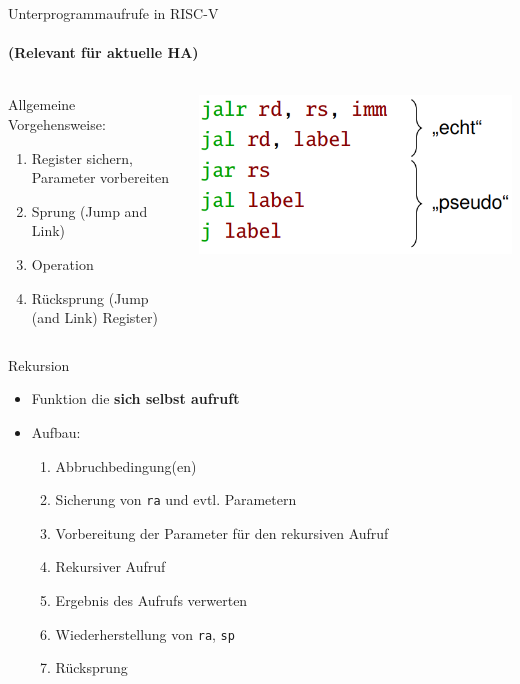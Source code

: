 \documentclass[
  german,            %
  aspectratio=169,    %
]{tumbeamer}
\begin{document}
\begin{frame}[c]{Unterprogrammaufrufe in RISC-V}
  \framesubtitle{(Relevant für aktuelle HA)}
  \begin{columns}[c]
    \begin{column}{0.5\textwidth}
      Allgemeine Vorgehensweise:\\[.2cm] 
      \begin{enumerate}
        \item Register sichern, Parameter vorbereiten
        \item Sprung (Jump and Link)
        \item Operation
        \item Rücksprung (Jump (and Link) Register)
      \end{enumerate}
    \end{column}
    \begin{column}{0.4\textwidth}
      \includegraphics[width=\linewidth]{w03_jumpInstructionsWithPseudo_zue.png}
    \end{column}
  \end{columns}
\end{frame}

\begin{frame}[c, fragile]{Rekursion}{}
  \begin{itemize}
    \item Funktion die \textbf{sich selbst aufruft}
    \item Aufbau:
          \begin{enumerate}
            \item Abbruchbedingung(en)
            \item Sicherung von \verb|ra| und evtl. Parametern
            \item Vorbereitung der Parameter für den rekursiven Aufruf
            \item Rekursiver Aufruf
            \item Ergebnis des Aufrufs verwerten
            \item Wiederherstellung von \verb|ra|, \verb|sp|
            \item Rücksprung
          \end{enumerate}
  \end{itemize}
\end{frame}
\end{document}
